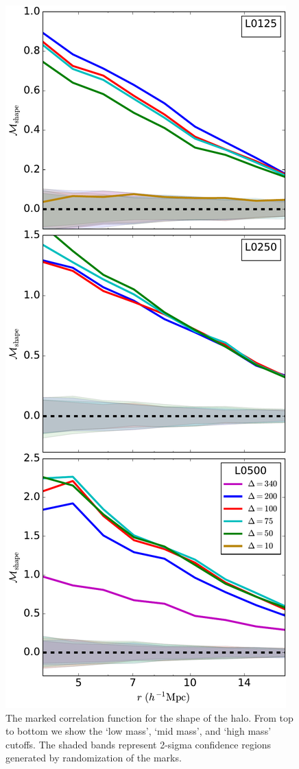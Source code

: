 \documentclass[usenatbib]{mnras}
\begin{document}
\begin{figure}
	\centering
	\includegraphics[width=.4\textwidth]{all_mcf_shape.pdf}
	\caption{
	The marked correlation function for the shape of the halo. From top to bottom we show the `low mass', `mid mass', and `high mass' cutoffs. The shaded bands represent 2-sigma confidence regions generated by randomization of the marks. 
}
	\label{fig:cc_mcf_s}
\end{figure}
\end{document}
